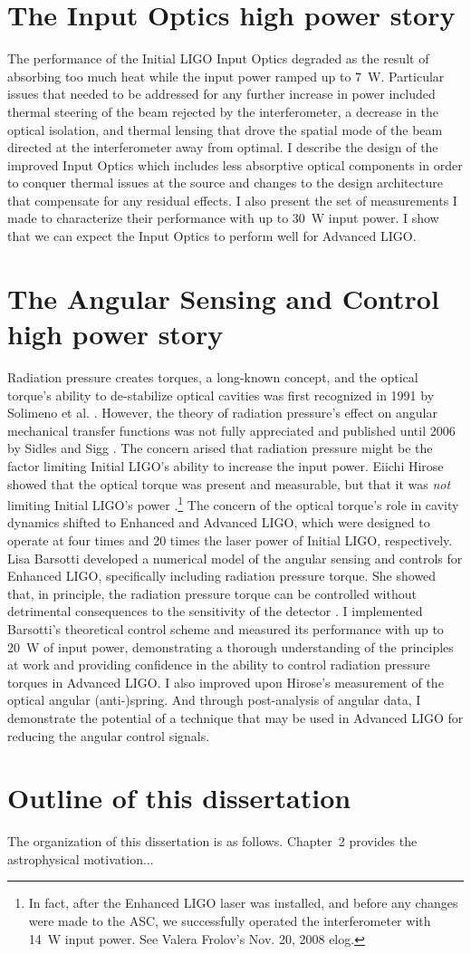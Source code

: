 \section{The Input Optics high power story} 
The performance of the Initial LIGO Input Optics degraded as the
result of absorbing too much heat while the input power ramped up to
7~W. Particular issues that needed to be addressed for any further
increase in power included thermal steering of the beam rejected by
the interferometer, a decrease in the optical isolation, and thermal
lensing that drove the spatial mode of the beam directed at the
interferometer away from optimal. I describe the design of the
improved Input Optics which includes less absorptive optical
components in order to conquer thermal issues at the source and
changes to the design architecture that compensate for any residual
effects. I also present the set of measurements I made to characterize
their performance with up to 30~W input power. I show that we can
expect the Input Optics to perform well for Advanced LIGO.



\section{The Angular Sensing and Control high power story}
Radiation pressure creates torques, a long-known concept, and the
optical torque's ability to de-stabilize optical cavities was first
recognized in 1991 by Solimeno et
al. \cite{Solimeno1991FabryPerot}. However, the theory of radiation
pressure's effect on angular mechanical transfer functions was not
fully appreciated and published until 2006 by Sidles and Sigg
\cite{Sidles2006Optical}. The concern arised that radiation pressure
might be the factor limiting Initial LIGO's ability to increase the
input power. Eiichi Hirose showed that the optical torque was present
and measurable, but that it was \emph{not} limiting Initial LIGO's
power \cite{Hirose2010Angular}.\footnote{In fact, after the Enhanced
  LIGO laser was installed, and before any changes were made to the
  ASC, we successfully operated the interferometer with 14~W input
  power. See Valera Frolov's Nov. 20, 2008 elog.} The concern of the
optical torque's role in cavity dynamics shifted to Enhanced and
Advanced LIGO, which were designed to operate at four times and 20
times the laser power of Initial LIGO, respectively. Lisa Barsotti
developed a numerical model of the angular sensing and controls for
Enhanced LIGO, specifically including radiation pressure torque. She
showed that, in principle, the radiation pressure torque can be
controlled without detrimental consequences to the sensitivity of the
detector \cite{Barsotti2009Modeling}. I implemented Barsotti's
theoretical control scheme and measured its performance with up to
20~W of input power, demonstrating a thorough understanding of the
principles at work and providing confidence in the ability to control
radiation pressure torques in Advanced LIGO. I also improved upon
Hirose's measurement of the optical angular (anti-)spring. And through
post-analysis of angular data, I demonstrate the potential of a
technique that may be used in Advanced LIGO for reducing the angular
control signals.



\section{Outline of this dissertation}
The organization of this
dissertation is as follows. Chapter~2 provides the astrophysical
motivation...
